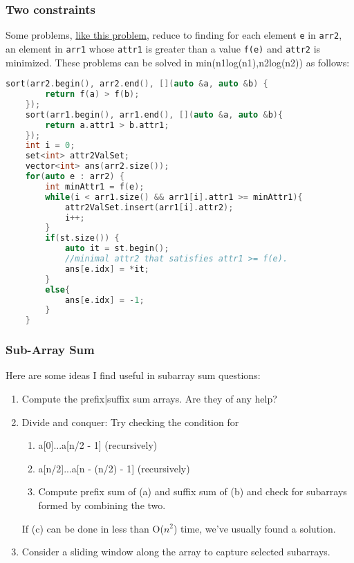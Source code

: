 \documentclass{article}
\begin{document}
\subsubsection{Two constraints}
Some problems, \href{https://leetcode.com/problems/closest-room/}{like this problem,} reduce to finding for each element \texttt{e} in \texttt{arr2}, an 
element in \texttt{arr1} whose \texttt{attr1} is greater than a value \texttt{f(e)} 
and \texttt{attr2} is minimized. These problems can be solved in min(n1log(n1),n2log(n2)) as follows:
\begin{lstlisting}[caption=Two constraints, language=C++]
    sort(arr2.begin(), arr2.end(), [](auto &a, auto &b) {
        return f(a) > f(b);
    });
    sort(arr1.begin(), arr1.end(), [](auto &a, auto &b){
        return a.attr1 > b.attr1;
    });
    int i = 0;
    set<int> attr2ValSet;
    vector<int> ans(arr2.size());
    for(auto e : arr2) {
        int minAttr1 = f(e);
        while(i < arr1.size() && arr1[i].attr1 >= minAttr1){
            attr2ValSet.insert(arr1[i].attr2);
            i++;
        }
        if(st.size()) {
            auto it = st.begin();
            //minimal attr2 that satisfies attr1 >= f(e).
            ans[e.idx] = *it;
        }
        else{
            ans[e.idx] = -1;
        }
    }
\end{lstlisting}
\subsubsection{Sub-Array Sum}
Here are some ideas I find useful in subarray sum questions:
\begin{enumerate}
    \item Compute the prefix|suffix sum arrays. Are they of any help?
    \item Divide and conquer: Try checking the condition for
    \begin{enumerate}
        \item a[0]...a[n/2 - 1] (recursively)
        \item a[n/2]...a[n - (n/2) - 1] (recursively)
        \item Compute prefix sum of (a) and suffix sum of (b)
        and check for subarrays formed by combining the two.
    \end{enumerate}
    If (c) can be done in less than O($n^2$) time, we've usually found a solution.
    \item Consider a sliding window along the array to capture selected
    subarrays. 
\end{enumerate}
\end{document}
